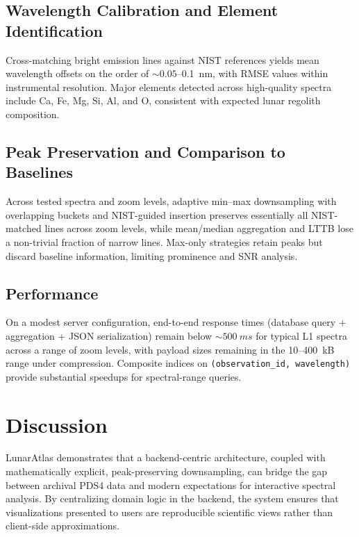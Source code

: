 \documentclass[12pt,a4paper]{article}
\begin{document}
\subsection{Wavelength Calibration and Element Identification}

Cross-matching bright emission lines against NIST references yields mean wavelength offsets on the order of \(\sim 0.05\)–0.1~nm, with RMSE values within instrumental resolution. Major elements detected across high-quality spectra include Ca, Fe, Mg, Si, Al, and O, consistent with expected lunar regolith composition.

\subsection{Peak Preservation and Comparison to Baselines}

Across tested spectra and zoom levels, adaptive min--max downsampling with overlapping buckets and NIST-guided insertion preserves essentially all NIST-matched lines across zoom levels, while mean/median aggregation and LTTB lose a non-trivial fraction of narrow lines. Max-only strategies retain peaks but discard baseline information, limiting prominence and SNR analysis.

\subsection{Performance}

On a modest server configuration, end-to-end response times (database query + aggregation + JSON serialization) remain below \(\sim \SI{500}{ms}\) for typical L1 spectra across a range of zoom levels, with payload sizes remaining in the 10–400~kB range under compression. Composite indices on \texttt{(observation\_id, wavelength)} provide substantial speedups for spectral-range queries.

\section{Discussion}
\label{sec:discussion}

LunarAtlas demonstrates that a backend-centric architecture, coupled with mathematically explicit, peak-preserving downsampling, can bridge the gap between archival PDS4 data and modern expectations for interactive spectral analysis. By centralizing domain logic in the backend, the system ensures that visualizations presented to users are reproducible scientific views rather than client-side approximations.
\end{document}
